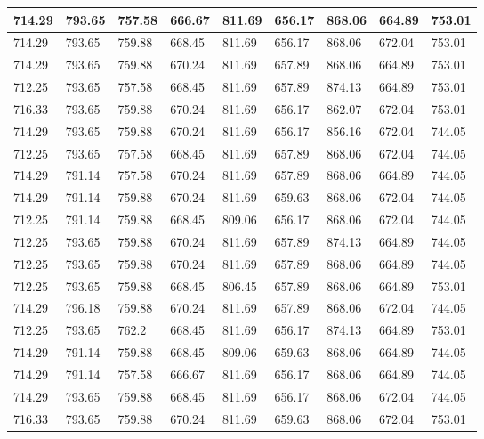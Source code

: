 \begin{longtable}{|l|l|l|l|l|l|l|l|l|}
		714.29   & 793.65  & 757.58  & 666.67  & 811.69 & 656.17  & 868.06   & 664.89  & 753.01  \\ \hline
		714.29   & 793.65  & 759.88  & 668.45  & 811.69 & 656.17  & 868.06   & 672.04  & 753.01  \\ \hline
		714.29   & 793.65  & 759.88  & 670.24  & 811.69 & 657.89  & 868.06   & 664.89  & 753.01  \\ \hline
		712.25   & 793.65  & 757.58  & 668.45  & 811.69 & 657.89  & 874.13   & 664.89  & 753.01  \\ \hline
		716.33   & 793.65  & 759.88  & 670.24  & 811.69 & 656.17  & 862.07   & 672.04  & 753.01  \\ \hline
		714.29   & 793.65  & 759.88  & 670.24  & 811.69 & 656.17  & 856.16   & 672.04  & 744.05  \\ \hline
		712.25   & 793.65  & 757.58  & 668.45  & 811.69 & 657.89  & 868.06   & 672.04  & 744.05  \\ \hline
		714.29   & 791.14  & 757.58  & 670.24  & 811.69 & 657.89  & 868.06   & 664.89  & 744.05  \\ \hline
		714.29   & 791.14  & 759.88  & 670.24  & 811.69 & 659.63  & 868.06   & 672.04  & 744.05  \\ \hline
		712.25   & 791.14  & 759.88  & 668.45  & 809.06 & 656.17  & 868.06   & 672.04  & 744.05  \\ \hline
		712.25   & 793.65  & 759.88  & 670.24  & 811.69 & 657.89  & 874.13   & 664.89  & 744.05  \\ \hline
		712.25   & 793.65  & 759.88  & 670.24  & 811.69 & 657.89  & 868.06   & 664.89  & 744.05  \\ \hline
		712.25   & 793.65  & 759.88  & 668.45  & 806.45 & 657.89  & 868.06   & 664.89  & 753.01  \\ \hline
		714.29   & 796.18  & 759.88  & 670.24  & 811.69 & 657.89  & 868.06   & 672.04  & 744.05  \\ \hline
		712.25   & 793.65  & 762.2   & 668.45  & 811.69 & 656.17  & 874.13   & 664.89  & 753.01  \\ \hline
		714.29   & 791.14  & 759.88  & 668.45  & 809.06 & 659.63  & 868.06   & 664.89  & 744.05  \\ \hline
		714.29   & 791.14  & 757.58  & 666.67  & 811.69 & 656.17  & 868.06   & 664.89  & 744.05  \\ \hline
		714.29   & 793.65  & 759.88  & 668.45  & 811.69 & 656.17  & 868.06   & 672.04  & 744.05  \\ \hline
		716.33   & 793.65  & 759.88  & 670.24  & 811.69 & 659.63  & 868.06   & 672.04  & 753.01  \\ \hline

\end{longtable}
